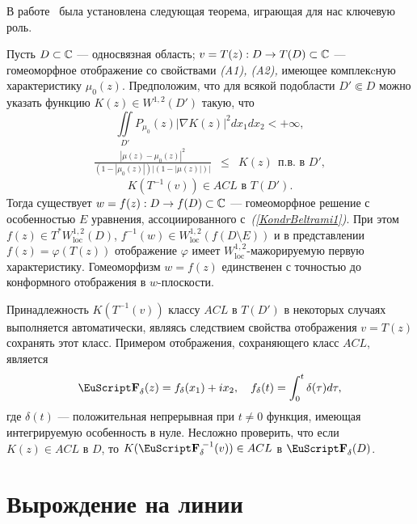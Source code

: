  В работе~\cite{KondrSibMat} была установлена следующая теорема, играющая для нас
 ключевую роль.
\begin{thm} \label{KondrOsnTeor1}
Пусть $D\subset\mathbb{C}$ --- односвязная область; $v=T(z):D\to T(D)\subset\mathbb{C}$ --- гомеоморфное отображение со свойствами  \emph{(A1), (A2),} имеющее комплекcную характеристику $\mu_0(z)$.
Предположим, что для всякой подобласти $D'\Subset D$ можно
указать  функцию $K(z)\in W^{1,2}(D')$ такую, что
$$
\iint\limits_{D'}P_{{\mu_0}}(z)
|\nabla K(z)|^2dx_1dx_2<+\infty,
$$
\begin{eqnarray}
\label{KondrNermaj2}
\frac{|\mu(z)-{\mu_0}(z)|^2}
{(1-|{\mu_0}(z)|)|(1-|\mu(z)|)|}&\leq& K(z) \ \ \mbox{п.в. в $D'$},\nonumber
\end{eqnarray}
$$
K(T^{-1}(v)) \in ACL \mbox{\ в \ } T(D').
$$
Тогда  существует $w=f(z):D\to f(D)\subset\mathbb{C}$ --- гомеоморфное  решение  с особенностью $E$ уравнения, ассоциированного с~\emph{(\ref{KondrBeltrami1})}. При этом
 $f(z)\in T^{*}W^{1,2}_{\mathrm{loc}}(D)$, $f^{-1}(w)\in W^{1,2}_{\mathrm{loc}}(f(D\setminus E))$ и
в представлении $f(z)=\varphi(T(z))$
отображение $\varphi$
имеет $W^{1,2}_{\mathrm{loc}}$-ма\-жо\-ри\-ру\-е\-мую
первую характеристику.
Гомеоморфизм $w=f(z)$ единственен с точностью до
конформного отображения в $w$-плоскости.
\end{thm}







\begin{remn}\label{KondrSohrACL}\rm Принадлежность $K(T^{-1}(v))$ классу $ACL$ в $T(D')$ в некоторых случаях выполняется автоматически, являясь следствием свойства отображения $v=T(z)$  сохранять  этот класс.
Примером отображения, сохраняющего класс $ACL$, является
\begin{equation}
\FF_\delta(z)=f_\delta(x_1)+i x_2, \ \ \ f_\delta(t)=\int_0^t\delta (\tau)d\tau,
\nonumber
\end{equation}
где  $\delta (t)$ --- положительная непрерывная
при $t\ne 0$ функция, имеющая интегрируемую особенность в нуле.
Несложно проверить, что
если  $K(z)\in ACL$ в $D$, то  $K(\FF^{\;-1}_\delta(v))\in ACL$ в $\FF_{\delta}(D)$.
\end{remn}



\section{Вырождение на линии}



